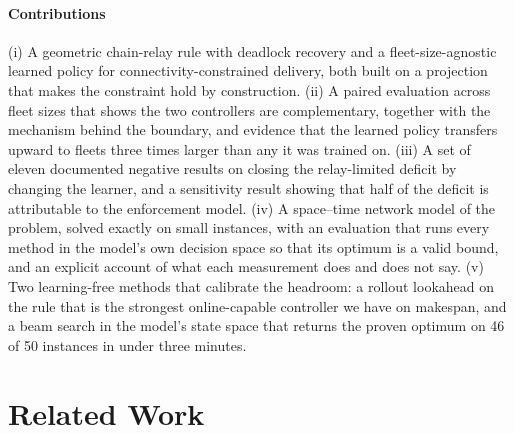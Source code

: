 \documentclass[final,5p,times,twocolumn]{elsarticle}
\begin{document}
\paragraph{Contributions}
(i) A geometric chain-relay rule with deadlock recovery and a fleet-size-agnostic learned
policy for connectivity-constrained delivery, both built on a projection that makes the
constraint hold by construction. (ii) A paired evaluation across fleet sizes that shows the two
controllers are complementary, together with the mechanism behind the boundary, and evidence that
the learned policy transfers upward to fleets three times larger than any it was trained on.
(iii) A set of eleven documented negative results on closing the relay-limited deficit by changing
the learner, and a sensitivity result showing that half of the deficit is attributable to the
enforcement model. (iv) A space--time network model of the problem, solved exactly on small
instances, with an evaluation that runs every method in the model's own decision space so that
its optimum is a valid bound, and an explicit account of what each measurement does and does not
say. (v) Two learning-free methods that calibrate the headroom: a rollout lookahead on the rule
that is the strongest online-capable controller we have on makespan, and a beam search in the
model's state space that returns the proven optimum on 46 of 50 instances in under three minutes.

\section{Related Work}
\label{sec:related}
\end{document}
